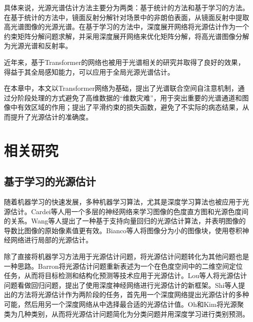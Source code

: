 \documentclass[
    type = master, %
    degree = academic,        %
    decl-page,  %
  ]{njuthesis}
\begin{document}
具体来说，光源光谱估计方法主要分为两类：基于统计的方法\cite{RN17,RN18,RN16,RN28,RN35}和基于学习的方法\cite{RN24,li2021multispectral}。在基于统计的方法中，镜面反射分解\cite{RN35}针对场景中的非朗伯表面，从镜面反射中提取高光谱图像的光源光谱。在基于学习的方法中，深度展开网络\cite{li2021multispectral}将光源估计作为一个约束矩阵分解问题求解，并采用深度展开网络来优化矩阵分解，将高光谱图像分解为光源光谱和反射率。

近年来，基于Transformer的网络也被用于光谱相关的研究并取得了良好的效果\cite{cai2022mask,roy2023spectral,li2023spectral}，得益于其全局感知能力，可以应用于全局光源光谱估计。

在本章中，本文以Transformer网络为基础，提出了光谱联合空间自注意机制，通过分阶段处理的方式避免了高维数据的“维数灾难”，用于突出重要的光谱通道和图像中有效区域的作用；提出了平滑约束的损失函数，避免了不实际的病态结果，从而提升了光源估计的准确度。
\section{相关研究}
\subsection{基于学习的光源估计}
随着机器学习的快速发展，多种机器学习算法，尤其是深度学习算法也被应用于光源估计。Cardei等人\cite{NTNU69}用一个多层的神经网络来学习图像的色度直方图和光源色度间的关系。Wang等人\cite{NTNU73}提出了一种基于支持向量回归的光源估计算法，并表明图像的导数比图像的原始像素值更有效。Bianco等人\cite{NTNU77}将图像分为小的图像块，使用卷积神经网络进行局部的光源估计。

除了直接将机器学习方法用于光源估计问题，将光源估计问题转化为其他问题也是一种思路。Barron\cite{NTNU71}将光源估计问题重新表述为一个在色度空间中的二维空间定位任务，从而将目标检测和结构化预测等技术应用于光源估计。Lou等人\cite{NTNU74}将光源估计问题看做回归问题，提出了使用深度神经网络进行光源估计的新框架。Shi等人\cite{NTNU75}提出的方法将光源估计作为两阶段的任务，首先用一个深度网络提出光源估计的多种可能，然后用另一个深度网络从中选择最合适的光源估计值。Oh和Kim\cite{NTNU76}将光源聚类为几种类别，从而将光源估计问题简化为分类问题并用深度学习进行类别预测。
\end{document}
